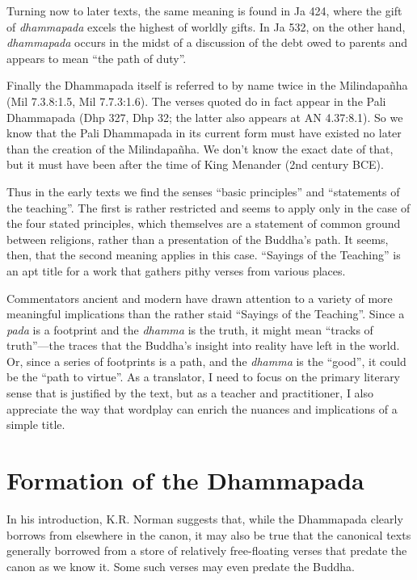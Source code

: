 \documentclass[12pt,openany]{book}%
\begin{document}
Turning now to later texts, the same meaning is found in Ja 424, where the gift of \textit{dhammapada} excels the highest of worldly gifts. In Ja 532, on the other hand, \textit{dhammapada} occurs in the midst of a discussion of the debt owed to parents and appears to mean “the path of duty”.

Finally the Dhammapada itself is referred to by name twice in the \textsanskrit{Milindapañha} (Mil 7.3.8:1.5, Mil 7.7.3:1.6). The verses quoted do in fact appear in the Pali Dhammapada (Dhp 327, Dhp 32; the latter also appears at AN 4.37:8.1). So we know that the Pali Dhammapada in its current form must have existed no later than the creation of the \textsanskrit{Milindapañha}. We don’t know the exact date of that, but it must have been after the time of King Menander (2nd century BCE).

Thus in the early texts we find the senses “basic principles” and “statements of the teaching”. The first is rather restricted and seems to apply only in the case of the four stated principles, which themselves are a statement of common ground between religions, rather than a presentation of the Buddha’s path. It seems, then, that the second meaning applies in this case. “Sayings of the Teaching” is an apt title for a work that gathers pithy verses from various places.

Commentators ancient and modern have drawn attention to a variety of more meaningful implications than the rather staid “Sayings of the Teaching”. Since a \textit{pada} is a footprint and the \textit{dhamma} is the truth, it might mean “tracks of truth”—the traces that the Buddha’s insight into reality have left in the world. Or, since a series of footprints is a path, and the \textit{dhamma} is the “good”, it could be the “path to virtue”. As a translator, I need to focus on the primary literary sense that is justified by the text, but as a teacher and practitioner, I also appreciate the way that wordplay can enrich the nuances and implications of a simple title.

\section*{Formation of the Dhammapada}

In his introduction, K.R. Norman suggests that, while the Dhammapada clearly borrows from elsewhere in the canon, it may also be true that the canonical texts generally borrowed from a store of relatively free-floating verses that predate the canon as we know it. Some such verses may even predate the Buddha.
\end{document}
